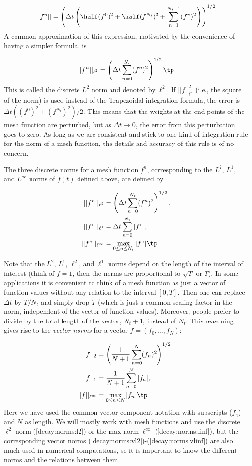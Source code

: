\documentclass[graybox,sectrefs,envcountresetchap,open=right,final]{svmonodo}
\begin{document}
\[ ||f^n|| = \left(\Delta t\left(\half(f^0)^2 + \half(f^{N_t})^2
+ \sum_{n=1}^{N_t-1} (f^n)^2\right)\right)^{1/2} \]
A common approximation of this expression, motivated by the
convenience of having a simpler formula, is

\[ ||f^n||_{\ell^2} = \left(\Delta t\sum_{n=0}^{N_t} (f^n)^2\right)^{1/2} \tp\]
This is called the discrete $L^2$ norm and denoted by $\ell^2$.
If $||f||_{\ell^2}^2$ (i.e., the square of the norm) is used
instead of the Trapezoidal integration formula,
the error
is $\Delta t((f^0)^2 + (f^{N_t})^2)/2$. This means that the
weights at the end points of the mesh function are perturbed,
but as $\Delta t\rightarrow 0$, the error from this perturbation goes
to zero. As long as we are consistent and
stick to one kind of integration
rule for the norm of a mesh function, the details and accuracy of this
rule is of no concern.

The three discrete norms for a mesh function $f^n$, corresponding to
the $L^2$, $L^1$, and $L^\infty$ norms of $f(t)$ defined above, are
defined by

\begin{align}
||f^n||_{\ell^2} &= \left( \Delta t\sum_{n=0}^{N_t} (f^n)^2\right)^{1/2},
\label{decay:norms:l2}\\ 
||f^n||_{\ell^1} &= \Delta t\sum_{n=0}^{N_t} |f^n|,
\label{decay:norms:l1}\\ 
||f^n||_{\ell^\infty} &= \max_{0\leq n\leq N_t}|f^n|\tp
\label{decay:norms:linf}
\end{align}

Note that the $L^2$, $L^1$, $\ell^2$, and $\ell^1$ norms depend on the
length of the interval of interest (think of $f=1$, then the
norms are proportional to $\sqrt{T}$ or $T$). In some applications it
is convenient to think of a mesh function as just a vector of function
values without any relation to the interval $[0,T]$.
Then one can replace $\Delta t$ by $T/N_t$ and simply drop $T$ (which
is just a common scaling factor in the norm,
independent of the vector of function
values). Moreover, people prefer
to divide by the total length of the vector, $N_t+1$, instead of $N_t$.
This reasoning gives rise to the \emph{vector norms} for a vector
$f=(f_0,\ldots,f_{N})$:

\begin{align}
||f||_2 &= \left( \frac{1}{N+1}\sum_{n=0}^{N} (f_n)^2\right)^{1/2},
\label{decay:norms:vl2}\\ 
||f||_1 &= \frac{1}{N+1}\sum_{n=0}^{N} |f_n|,
\label{decay:norms:vl1}\\ 
||f||_{\ell^\infty} &= \max_{0\leq n\leq N}|f_n|\tp
\label{decay:norms:vlinf}
\end{align}
Here we have used the common vector component notation with subscripts
($f_n$) and $N$ as length. We will mostly work with mesh functions
and use the discrete $\ell^2$
norm (\ref{decay:norms:l2}) or the max norm $\ell^\infty$
(\ref{decay:norms:linf}), but the corresponding vector norms
(\ref{decay:norms:vl2})-(\ref{decay:norms:vlinf}) are also much used
in numerical computations, so it is important to know the different
norms and the relations between them.
\end{document}
